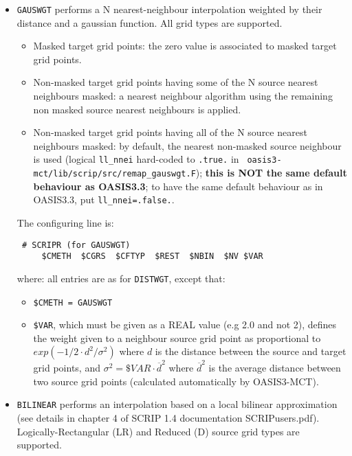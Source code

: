 \begin{itemize}
\begin{itemize}
  \item {\tt GAUSWGT} performs a N nearest-neighbour interpolation
    weighted by their distance and a gaussian function. All grid types
    are supported.
    \begin{itemize}

    \item Masked target grid points: the zero value is associated to
      masked target grid points.

    \item Non-masked target grid points having some of the N source
      nearest neighbours masked: a nearest neighbour algorithm using
      the remaining non masked source nearest neighbours is applied.

    \item Non-masked target grid points having all of the N source
      nearest neighbours masked: by default, the nearest non-masked
      source neighbour is used (logical {\tt ll\_nnei} hard-coded to
      {\tt .true.} in {\tt
        oasis3-mct/lib/scrip/src/remap\_gauswgt.F}); {\bf this is NOT
        the same default behaviour as OASIS3.3}; to have the same
      default behaviour as in OASIS3.3, put {\tt ll\_nnei=.false.}.
    \end{itemize}

    The configuring line is:
  \begin{verbatim}
 # SCRIPR (for GAUSWGT)
     $CMETH  $CGRS  $CFTYP  $REST  $NBIN  $NV $VAR
\end{verbatim}
    where:
    all entries are as for {\tt DISTWGT}, except that:
    \begin{itemize}
    \item {\tt \$CMETH = GAUSWGT}
    \item {\tt \$VAR}, which must be given as a REAL value (e.g 2.0
      and not 2), defines the weight given to a neighbour source grid
      point as proportional to $exp(-1/2 \cdot d^2/\sigma^2)$ where
      $d$ is the distance between the source and target grid points,
      and $\sigma^2 = \$VAR \cdot \overline{d}^2$ where
      $\overline{d}^2$ is the average distance between two source grid
      points (calculated automatically by OASIS3-MCT).
    \end{itemize}

  \item {\tt BILINEAR} performs an interpolation based on a local
    bilinear approximation (see details in chapter 4 of SCRIP 1.4
    documentation SCRIPusers.pdf). Logically-Rectangular (LR) and
    Reduced (D) source grid types are supported.


\end{itemize}
\end{itemize}

